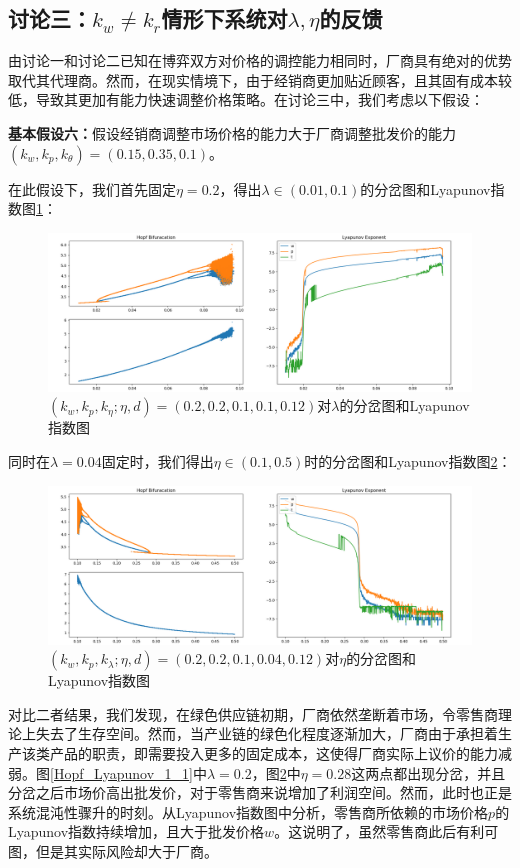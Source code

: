 \documentclass{article}
\begin{document}
\subsection{讨论三：$k_w\neq k_r$情形下系统对$\lambda, \eta$的反馈}
\par 由讨论一和讨论二已知在博弈双方对价格的调控能力相同时，厂商具有绝对的优势取代其代理商。然而，在现实情境下，由于经销商更加贴近顾客，且其固有成本较低，导致其更加有能力快速调整价格策略。在讨论三中，我们考虑以下假设：
\par \textbf{基本假设六：}假设经销商调整市场价格的能力大于厂商调整批发价的能力$(k_w, k_p, k_\theta)=(0.15,0.35,0.1)$。
\par 在此假设下，我们首先固定$\eta=0.2$，得出$\lambda\in(0.01,0.1)$的分岔图和Lyapunov指数图\ref{Hopf_Lyapunov_3_1}：
\begin{figure}[H]
    \centering
    \includegraphics[width=16.5cm]{Hopf_Lyapunov_3_1.png}
    \caption{$(k_w,k_p,k_\eta;\eta,d)=(0.2,0.2,0.1,0.1,0.12)$对$\lambda$的分岔图和Lyapunov指数图}
    \label{Hopf_Lyapunov_3_1}
\end{figure}
\par 同时在$\lambda=0.04$固定时，我们得出$\eta\in(0.1, 0.5)$时的分岔图和Lyapunov指数图\ref{Hopf_Lyapunov_3_2}：
\begin{figure}[H]
    \centering
    \includegraphics[width=16.5cm]{Hopf_Lyapunov_3_2.png}
    \caption{$(k_w,k_p,k_\lambda;\eta,d)=(0.2,0.2,0.1,0.04,0.12)$对$\eta$的分岔图和Lyapunov指数图}
    \label{Hopf_Lyapunov_3_2}
\end{figure}
\par 对比二者结果，我们发现，在绿色供应链初期，厂商依然垄断着市场，令零售商理论上失去了生存空间。然而，当产业链的绿色化程度逐渐加大，厂商由于承担着生产该类产品的职责，即需要投入更多的固定成本，这使得厂商实际上议价的能力减弱。图\ref{Hopf_Lyapunov_1_1}中$\lambda=0.2$，图\ref{Hopf_Lyapunov_3_2}中$\eta=0.28$这两点都出现分岔，并且分岔之后市场价高出批发价，对于零售商来说增加了利润空间。然而，此时也正是系统混沌性骤升的时刻。从Lyapunov指数图中分析，零售商所依赖的市场价格$p$的Lyapunov指数持续增加，且大于批发价格$w$。这说明了，虽然零售商此后有利可图，但是其实际风险却大于厂商。
\end{document}
